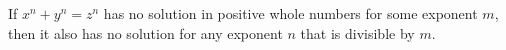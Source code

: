 If $x^n + y^n = z^n$ has no solution in positive whole numbers for some exponent $m$, then it also has no solution for any exponent $n$ that is divisible by $m$.
